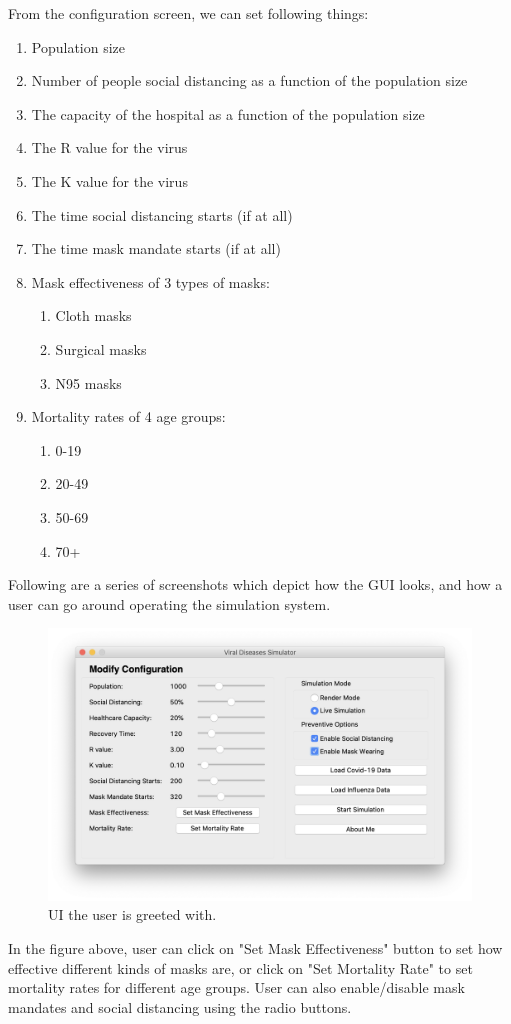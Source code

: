 \documentclass[11pt]{article}
\begin{document}
From the configuration screen, we can set following things:
\begin{enumerate}
    \item Population size
    \item Number of people social distancing as a function of the population size
    \item The capacity of the hospital as a function of the population size
    \item The R value for the virus
    \item The K value for the virus
    \item The time social distancing starts (if at all)
    \item The time mask mandate starts (if at all)
    \item Mask effectiveness of 3 types of masks:
    \begin{enumerate}
        \item Cloth masks
        \item Surgical masks
        \item N95 masks
    \end{enumerate}
    \item Mortality rates of 4 age groups:
        \begin{enumerate}
            \item 0-19
            \item 20-49
            \item 50-69
            \item 70+
        \end{enumerate}
\end{enumerate}

Following are a series of screenshots which depict how the GUI looks, and how a user can go around operating the simulation system.
\begin{figure}[H]
    \centering
    \includegraphics[width=14cm]{figures/ui-vis.png}
    \caption{UI the user is greeted with.}
    \label{fig:main_ui}
\end{figure}
In the figure above, user can click on "Set Mask Effectiveness" button to set how effective different kinds of masks are, or click on "Set Mortality Rate" to set mortality rates for different age groups. User can also enable/disable mask mandates and social distancing using the radio buttons. 
\end{document}
